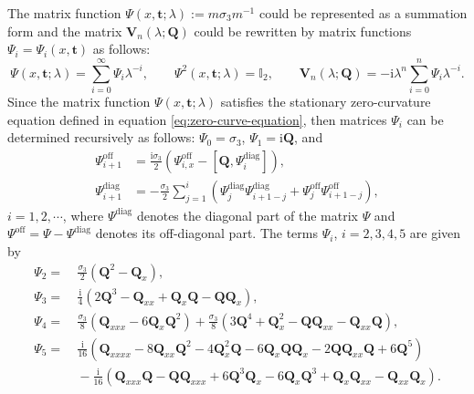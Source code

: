 \documentclass[11pt,reqno]{amsart}
\newcommand{\ii}{\mathrm{i}}
\newcommand{\diag}{\mathrm{diag}}
\newcommand{\off}{\mathrm{off}}
\numberwithin{equation}{section}
\begin{document}
The matrix function $\Psi(x,\mathbf{t};\lambda):=m\sigma_3 m^{-1}$ could be represented as a summation form and the matrix $\mathbf{V}_n(\lambda;\mathbf{Q})$ could be rewritten by matrix functions $\Psi_i=\Psi_i(x,\mathbf{t})$ as follows:
\begin{equation}\label{eq:Theta-expand-lambda-infty}
	\Psi(x,\mathbf{t};\lambda)=\sum_{i=0}^{\infty}\Psi_i\lambda^{-i},\qquad \Psi^2(x,\mathbf{t};\lambda)=\mathbb{I}_2, \qquad 	\mathbf{V}_n(\lambda;\mathbf{Q})=-\ii \lambda^{n} \sum_{i=0}^{n}\Psi_i\lambda^{-i}.
\end{equation} 
Since the matrix function $\Psi(x,\mathbf{t};\lambda)$ satisfies the stationary zero-curvature equation defined in equation \eqref{eq:zero-curve-equation}, then
matrices $\Psi_i$ can be determined recursively as follows: $\Psi_0=\sigma_3$, $\Psi_{1}=\ii \mathbf{Q}$, and
\begin{subequations}\label{eq:Theta-i-expression}
\begin{align}
	\Psi_{i+1}^{\off}
	&=\frac{\ii \sigma_3}{2}\left(\Psi_{i,x}^{\off} -\left[\mathbf{Q},
	\Psi_{i}^{\diag}\right]\right), \label{eq:Theta-i-expression-off}\\
	\Psi_{i+1}^{\diag}
	&=-\frac{\sigma_3}{2}\sum_{j=1}^{i}\left(\Psi_{j}^{\diag}\Psi_{i+1-j}^{\diag}+\Psi_{j}^{\off}\Psi_{i+1-j}^{\off}\right), \label{eq:Theta-i-expression-diag}
\end{align}
\end{subequations}
$i=1,2,\cdots$, where $\Psi^{\diag}$ denotes the diagonal part of the matrix $\Psi$ and $\Psi^{\off}=\Psi-\Psi^{\diag}$ denotes its off-diagonal part.
The terms $\Psi_i$, $i=2,3,4,5$ are given by
\begin{equation}\label{eq:Psi-i}
\begin{split}
\Psi_2= &\  \frac{\sigma_3}{2}(\mathbf{Q}^2-\mathbf{Q}_x), \\
\Psi_3= &\ \frac{\ii}{4}(2\mathbf{Q}^3-\mathbf{Q}_{xx}+\mathbf{Q}_x\mathbf{Q}-\mathbf{Q}\mathbf{Q}_x), \\
\Psi_4=&\  \frac{\sigma_3}{8}(\mathbf{Q}_{xxx}-6\mathbf{Q}_x\mathbf{Q}^2)+\frac{\sigma_3}{8}(3\mathbf{Q}^4+\mathbf{Q}_x^2-\mathbf{Q}\mathbf{Q}_{xx}-\mathbf{Q}_{xx}\mathbf{Q}), \\
\Psi_5=&\ \frac{\ii}{16}(\mathbf{Q}_{xxxx}-8\mathbf{Q}_{xx}\mathbf{Q}^2-4\mathbf{Q}_{x}^2\mathbf{Q}-6\mathbf{Q}_{x}\mathbf{Q}\mathbf{Q}_{x}-2\mathbf{Q}\mathbf{Q}_{xx}\mathbf{Q}+6\mathbf{Q}^5) \\
&\ -\frac{\ii}{16}(\mathbf{Q}_{xxx}\mathbf{Q}-\mathbf{Q}\mathbf{Q}_{xxx}+6\mathbf{Q}^3\mathbf{Q}_x-6\mathbf{Q}_x\mathbf{Q}^3+\mathbf{Q}_x\mathbf{Q}_{xx}-\mathbf{Q}_{xx}\mathbf{Q}_x).
\end{split}
\end{equation}
\end{document}
